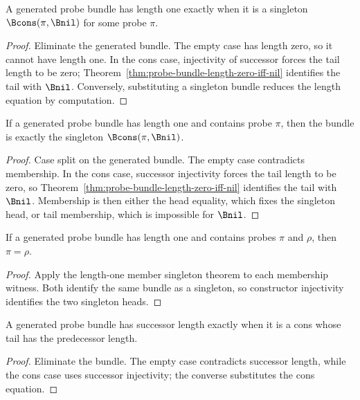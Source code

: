 \begin{theorem}
\label{thm:probe-bundle-length-one-iff-singleton}
A generated probe bundle has length one exactly when it is a singleton
$\Bcons(\pi,\Bnil)$ for some probe $\pi$.
\end{theorem}
\begin{proof}
Eliminate the generated bundle. The empty case has length zero, so it cannot have length one. In the cons case, injectivity of successor forces the tail length to be zero; Theorem~\ref{thm:probe-bundle-length-zero-iff-nil} identifies the tail with $\Bnil$. Conversely, substituting a singleton bundle reduces the length equation by computation.
\end{proof}

\begin{theorem}
\label{thm:bundle-member-length-one-singleton}
If a generated probe bundle has length one and contains probe \(\pi\), then the
bundle is exactly the singleton \(\Bcons(\pi,\Bnil)\).
\end{theorem}
\begin{proof}
Case split on the generated bundle. The empty case contradicts membership. In
the cons case, successor injectivity forces the tail length to be zero, so
Theorem~\ref{thm:probe-bundle-length-zero-iff-nil} identifies the tail with
\(\Bnil\). Membership is then either the head equality, which fixes the
singleton head, or tail membership, which is impossible for \(\Bnil\).
\end{proof}

\begin{theorem}
\label{thm:bundle-length-one-membership-unique}
If a generated probe bundle has length one and contains probes \(\pi\) and
\(\rho\), then \(\pi=\rho\).
\end{theorem}
\begin{proof}
Apply the length-one member singleton theorem to each membership witness. Both
identify the same bundle as a singleton, so constructor injectivity identifies
the two singleton heads.
\end{proof}

\begin{theorem}
\label{thm:bundle-length-succ-iff-cons}
A generated probe bundle has successor length exactly when it is a cons whose
tail has the predecessor length.
\end{theorem}
\begin{proof}
Eliminate the bundle. The empty case contradicts successor length, while the
cons case uses successor injectivity; the converse substitutes the cons equation.
\end{proof}

